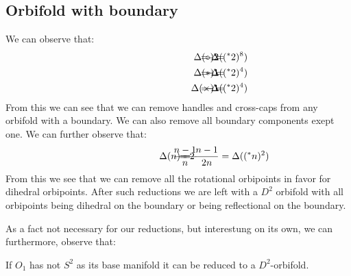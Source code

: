 \subsection{Orbifold with boundary}\label{orbifold_with_boundary}
We can observe that:
\begin{align}
\hspace{3cm}\Delta(\circ) =& \hspace{-1cm} &-2& \hspace{-1cm} &= \Delta((^\ast 2)^8) \\
\hspace{3cm}\Delta(\ast) =& \hspace{-1cm} &-1& \hspace{-1cm} &= \Delta((^\ast 2)^4) \\
\hspace{3cm}\Delta(\times) =& \hspace{-1cm} &-1& \hspace{-1cm} &= \Delta((^\ast 2)^4)
\end{align}
From this we can see that we can remove handles and cross-caps 
from any orbifold with a boundary. 
We can also remove all boundary components exept one.         
We can further observe that:
\begin{align}
\hspace{3cm}\Delta(n) =& \hspace{-1cm} &\frac{n-1}{n}& \hspace{-1cm} 
&= 2\frac{n-1}{2n} &= \Delta((^\ast n)^2)\label{third_reduction}
\end{align}
From this we see that we can remove all the rotational orbipoints in favor for 
dihedral orbipoints.
After such reductions we are left with a $D^2$ orbifold with all orbipoints being dihedral on 
the boundary or being reflectional on the boundary. 

As a fact not necessary for our reductions, but interestung on its own, we can furthermore, 
observe that:
\begin{observation}
If $O_1$ has not $S^2$ as its base manifold it can be reduced to a $D^2$-orbifold.
\end{observation}
